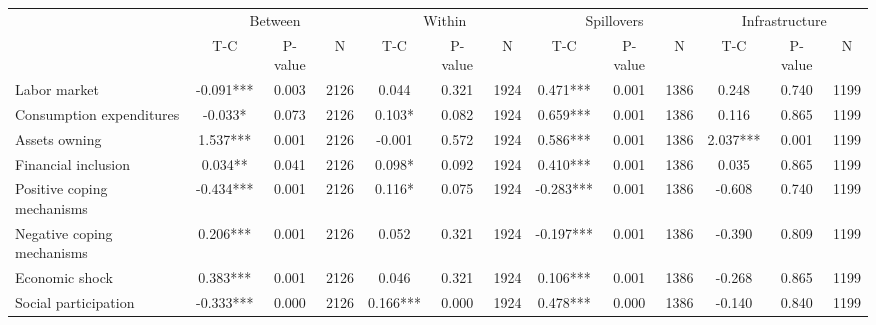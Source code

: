 
\begin{tabular}{l*{12}{c}}\hline&\multicolumn{3}{c}{Between}&\multicolumn{3}{c}{Within}&\multicolumn{3}{c}{Spillovers}&\multicolumn{3}{c}{Infrastructure} \\ \cmidrule(r){2-4}\cmidrule(l){5-7}\cmidrule(l){8-10}\cmidrule(l){9-13} & {T-C} & {P-value} & {N} & {T-C} & {P-value} & {N}  & {T-C} & {P-value} & {N} & {T-C} & {P-value} & {N} \\ \midrule

 Labor market &       -0.091*** &        0.003 & 2126    &        0.044 &        0.321 & 1924    &        0.471*** &        0.001 & 1386 &        0.248 &        0.740 & 1199 \\ 

 Consumption expenditures &       -0.033* &        0.073 & 2126    &        0.103* &        0.082 & 1924    &        0.659*** &        0.001 & 1386 &        0.116 &        0.865 & 1199 \\ 

 Assets owning &        1.537*** &        0.001 & 2126    &       -0.001 &        0.572 & 1924    &        0.586*** &        0.001 & 1386 &        2.037*** &        0.001 & 1199 \\ 

 Financial inclusion &        0.034** &        0.041 & 2126    &        0.098* &        0.092 & 1924    &        0.410*** &        0.001 & 1386 &        0.035 &        0.865 & 1199 \\ 

 Positive coping mechanisms &       -0.434*** &        0.001 & 2126    &        0.116* &        0.075 & 1924    &       -0.283*** &        0.001 & 1386 &       -0.608 &        0.740 & 1199 \\ 

 Negative coping mechanisms &        0.206*** &        0.001 & 2126    &        0.052 &        0.321 & 1924    &       -0.197*** &        0.001 & 1386 &       -0.390 &        0.809 & 1199 \\ 

 Economic shock &        0.383*** &        0.001 & 2126    &        0.046 &        0.321 & 1924    &        0.106*** &        0.001 & 1386 &       -0.268 &        0.865 & 1199 \\ 

 Social participation &       -0.333*** &        0.000 & 2126    &        0.166*** &        0.000 & 1924    &        0.478*** &        0.000 & 1386 &       -0.140 &        0.840 & 1199 \\ 


\end{tabular}
